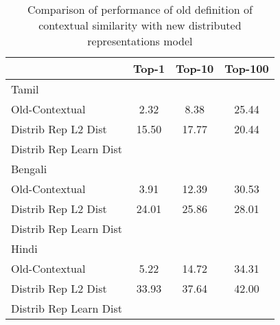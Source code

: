 \documentclass[11pt,letterpaper]{article}
\begin{document}
\begin{table}
\begin{center}
\begin{tabular}{|l|c|c|c|}
\hline
& Top-1 & Top-10 & Top-100 \\
\hline
\multicolumn{4}{|l|}{Tamil}  \\
\hline
Old-Contextual & 2.32 & 8.38 & 25.44 \\ 
Distrib Rep L2 Dist & 15.50 & 17.77 & 20.44 \\
Distrib Rep Learn Dist & & & \\
\hline
\multicolumn{4}{|l|}{Bengali}  \\
\hline
Old-Contextual & 3.91 & 12.39 & 30.53 \\
Distrib Rep L2 Dist & 24.01 & 25.86 & 28.01 \\
Distrib Rep Learn Dist & & & \\
\hline
\multicolumn{4}{|l|}{Hindi}  \\
\hline
Old-Contextual & 5.22 & 14.72 & 34.31 \\
Distrib Rep L2 Dist & 33.93 & 37.64 & 42.00 \\
Distrib Rep Learn Dist & & & \\
\hline
\end{tabular}
\end{center}
\caption{Comparison of performance of old definition of contextual similarity with new distributed representations model}\label{accresults}
\end{table}








\end{document}
